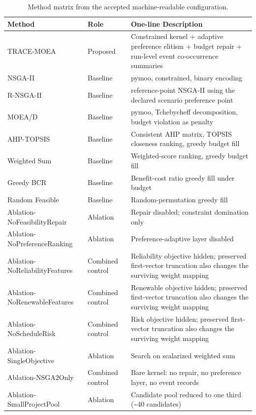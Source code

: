 \documentclass[energies,article,submit,moreauthors]{Definitions/mdpi}
\begin{document}
\begin{table}[t]
\centering
\scriptsize
\setlength{\tabcolsep}{3pt}
\caption{Method matrix from the accepted machine-readable configuration.}\label{tab:3}
\begin{tabularx}{\textwidth}{@{}>{\raggedright\arraybackslash}X >{\raggedright\arraybackslash}X >{\raggedright\arraybackslash}X@{}}
\toprule
Method & Role & One-line Description \\
\midrule
TRACE-MOEA & Proposed & Constrained kernel + adaptive preference elitism + budget repair + run-level event co-occurrence summaries \\
NSGA-II & Baseline & pymoo, constrained, binary encoding \\
R-NSGA-II & Baseline & reference-point NSGA-II using the declared scenario preference point \\
MOEA/D & Baseline & pymoo, Tchebycheff decomposition, budget violation as penalty \\
AHP-TOPSIS & Baseline & Consistent AHP matrix, TOPSIS closeness ranking, greedy budget fill \\
Weighted Sum & Baseline & Weighted-score ranking, greedy budget fill \\
Greedy BCR & Baseline & Benefit-cost ratio greedy fill under budget \\
Random Feasible & Baseline & Random-permutation greedy fill \\
Ablation-NoFeasibilityRepair & Ablation & Repair disabled; constraint domination only \\
Ablation-NoPreferenceRanking & Ablation & Preference-adaptive layer disabled \\
Ablation-NoReliabilityFeatures & Combined control & Reliability objective hidden; preserved first-vector truncation also changes the surviving weight mapping \\
Ablation-NoRenewableFeatures & Combined control & Renewable objective hidden; preserved first-vector truncation also changes the surviving weight mapping \\
Ablation-NoScheduleRisk & Combined control & Risk objective hidden; preserved first-vector truncation also changes the surviving weight mapping \\
Ablation-SingleObjective & Ablation & Search on scalarized weighted sum \\
Ablation-NSGA2Only & Combined control & Bare kernel: no repair, no preference layer, no event records \\
Ablation-SmallProjectPool & Ablation & Candidate pool reduced to one third (\textasciitilde{}40 candidates) \\
\bottomrule
\end{tabularx}
\end{table}
\end{document}
